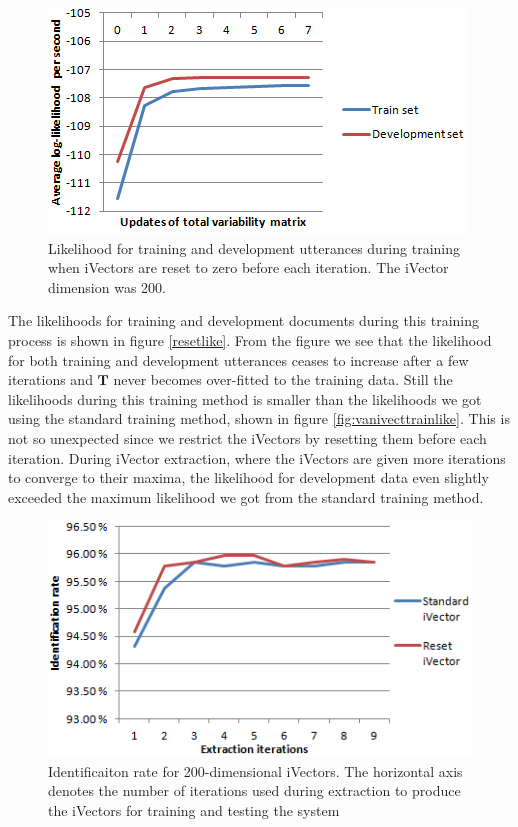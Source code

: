 \begin{figure}[hbt!]
	\begin{center}
	\includegraphics{figures/resetlike.png}
	\caption{Likelihood for training and development utterances during training when iVectors are reset to zero before each iteration. The iVector dimension was 200.}
	\label{fig:resetlike}
	\end{center}
\end{figure}

The likelihoods for training and development documents during this training process is shown in figure \ref{resetlike}. From the figure we see that the likelihood for both training and development utterances ceases to increase after a few iterations and $\mathbf{T}$ never becomes over-fitted to the training data. Still the likelihoods during this training method is smaller than the likelihoods we got using the standard training method, shown in figure \ref{fig:vanivecttrainlike}. This is not so unexpected since we restrict the iVectors by resetting them before each iteration. During iVector extraction, where the iVectors are given more iterations to converge to their maxima, the likelihood for development data even slightly exceeded the maximum likelihood we got from the standard training method.

\begin{figure}[hbt!]
	\begin{center}
	\includegraphics{figures/resetidentification.png}
	\caption{Identificaiton rate for 200-dimensional iVectors. The horizontal axis denotes the number of iterations used during extraction to produce the iVectors for training and testing the system}
	\label{fig:resetidrate}
	\end{center}
\end{figure}

